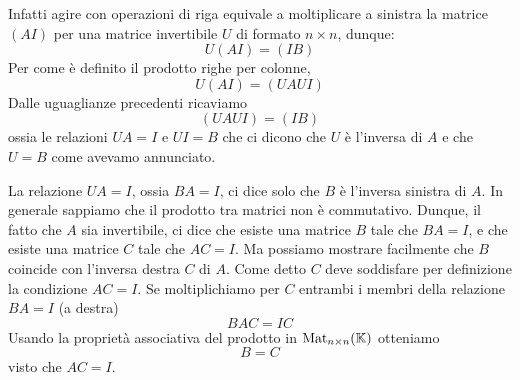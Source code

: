 Infatti agire con operazioni di riga equivale a moltiplicare a sinistra la matrice
$(A I)$ per una matrice invertibile $U$ di formato $n \times n$, dunque:
\[
	U (A I) = (I B)
\]
Per come è definito il prodotto righe per colonne,
\[
	U (A I) = (U A U I)
\]
Dalle uguaglianze precedenti ricaviamo
\[
	(U A U I) = (I B)
\]
ossia le relazioni $U A = I$ e $U I = B$ che ci dicono che $U$ è l'inversa di
$A$ e che $U = B$ come avevamo annunciato.

\begin{observation}
	La relazione $U A = I$, ossia $BA = I$, ci dice solo che $B$ è l'inversa
	sinistra di $A$. In generale sappiamo che il prodotto tra matrici non è
	commutativo. Dunque, il fatto che $A$ sia invertibile, ci dice che esiste una
	matrice $B$ tale che $BA = I$, e che esiste una matrice $C$ tale che $AC = I$.
	Ma possiamo mostrare facilmente che $B$ coincide con l'inversa destra $C$ di
	$A$. Come detto $C$ deve soddisfare per definizione la condizione $AC = I$.
	Se moltiplichiamo per $C$ entrambi i membri della relazione $BA = I$ (a destra)
	\[ BAC = IC \] Usando la proprietà associativa del prodotto in
	$\operatorname{Mat}_{n \times n}(\mathbb{K})$ otteniamo \[B = C\] visto che $AC = I$.
\end{observation}

